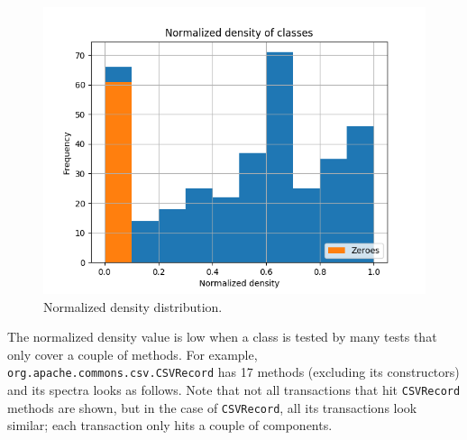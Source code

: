 \begin{figure}
    \centering
    \includegraphics[width=\linewidth]{figures/histogram_normalized_density}
    \caption{Normalized density distribution.}
    \label{fig:hist_normalized_density}
\end{figure}

The normalized density value is low when a class is tested by many tests that only cover a couple of methods. 
For example, \texttt{org.apache.commons.csv.CSVRecord} has 17 methods (excluding its constructors) and its spectra looks as follows.
Note that not all transactions that hit \texttt{CSVRecord} methods are shown, but in the case of \texttt{CSVRecord}, all its transactions look similar; each transaction only hits a couple of components.


\begin{table}[]
\scriptsize
\centering
\caption{Partial activity matrix of the \texttt{CSVRecord} class.}
\label{tab:csvrecordtest}
\noindent{}
\end{table}


